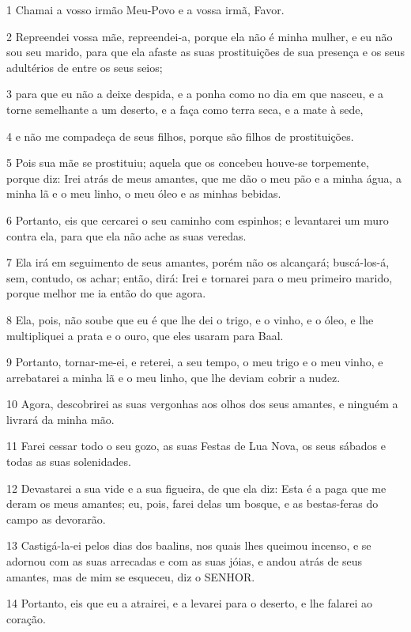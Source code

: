 \par 1 Chamai a vosso irmão Meu-Povo e a vossa irmã, Favor.
\par 2 Repreendei vossa mãe, repreendei-a, porque ela não é minha mulher, e eu não sou seu marido, para que ela afaste as suas prostituições de sua presença e os seus adultérios de entre os seus seios;
\par 3 para que eu não a deixe despida, e a ponha como no dia em que nasceu, e a torne semelhante a um deserto, e a faça como terra seca, e a mate à sede,
\par 4 e não me compadeça de seus filhos, porque são filhos de prostituições.
\par 5 Pois sua mãe se prostituiu; aquela que os concebeu houve-se torpemente, porque diz: Irei atrás de meus amantes, que me dão o meu pão e a minha água, a minha lã e o meu linho, o meu óleo e as minhas bebidas.
\par 6 Portanto, eis que cercarei o seu caminho com espinhos; e levantarei um muro contra ela, para que ela não ache as suas veredas.
\par 7 Ela irá em seguimento de seus amantes, porém não os alcançará; buscá-los-á, sem, contudo, os achar; então, dirá: Irei e tornarei para o meu primeiro marido, porque melhor me ia então do que agora.
\par 8 Ela, pois, não soube que eu é que lhe dei o trigo, e o vinho, e o óleo, e lhe multipliquei a prata e o ouro, que eles usaram para Baal.
\par 9 Portanto, tornar-me-ei, e reterei, a seu tempo, o meu trigo e o meu vinho, e arrebatarei a minha lã e o meu linho, que lhe deviam cobrir a nudez.
\par 10 Agora, descobrirei as suas vergonhas aos olhos dos seus amantes, e ninguém a livrará da minha mão.
\par 11 Farei cessar todo o seu gozo, as suas Festas de Lua Nova, os seus sábados e todas as suas solenidades.
\par 12 Devastarei a sua vide e a sua figueira, de que ela diz: Esta é a paga que me deram os meus amantes; eu, pois, farei delas um bosque, e as bestas-feras do campo as devorarão.
\par 13 Castigá-la-ei pelos dias dos baalins, nos quais lhes queimou incenso, e se adornou com as suas arrecadas e com as suas jóias, e andou atrás de seus amantes, mas de mim se esqueceu, diz o SENHOR.
\par 14 Portanto, eis que eu a atrairei, e a levarei para o deserto, e lhe falarei ao coração.
